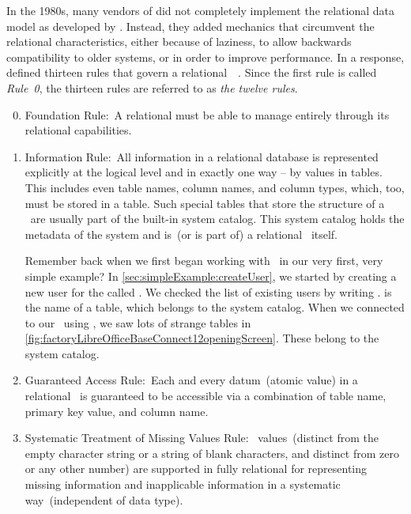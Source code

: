 %
\label{sec:rdbms}%
%
In the 1980s, many vendors of  did not completely implement the relational data model as developed by \citeauthor{C1985IYDRR}.
Instead, they added mechanics that circumvent the relational characteristics, either because of laziness, to allow backwards compatibility to older systems, or in order to improve performance.
In a response, \citeauthor{C1985IYDRR} defined thirteen rules that govern a relational~~\cite{C1985IYDRR,C1986AESFDBMSTACTBR,S2024D:LDMRMRA,SP2002STYSI2D,SPMP1998SI2TDDASVEI12T}.
Since the first rule is called \emph{Rule~0}, the thirteen rules are referred to as \emph{the twelve rules}.%
%
\begin{enumerate}%
\setcounter{enumi}{-1}%
%
\item Foundation Rule:~A relational  must be able to manage  entirely through its relational capabilities.%
%
\item Information Rule:~All information in a relational database is represented explicitly at the logical level and in exactly one way -- by values in tables.
This includes even table names, column names, and column types, which, too, must be stored in a table.
Such special tables that store the structure of a \db\ are usually part of the built-in system catalog.
This system catalog holds the metadata of the system and is~(or is part of) a relational \db\ itself.

Remember back when we first began working with \postgresql\ in our very first, very simple example?
In \cref{sec:simpleExample:createUser}, we started by creating a new user for the  called .
We checked the list of existing users by writing .
 is the name of a table, which belongs to the system catalog.
When we connected to our \db\ using \libreofficeBase, we saw lots of strange tables in \cref{fig:factoryLibreOfficeBaseConnect12openingScreen}.
These belong to the system catalog.%
%
\item Guaranteed Access Rule:~Each and every datum~(atomic value) in a relational \db\ is guaranteed to be accessible via a combination of table name, primary key value, and column name.%
%
\item Systematic Treatment of Missing Values Rule:~ values~(distinct from the empty character string or a string of blank characters, and distinct from zero or any other number) are supported in fully relational  for representing missing information and inapplicable information in a systematic way~(independent of data type).


\end{enumerate}
